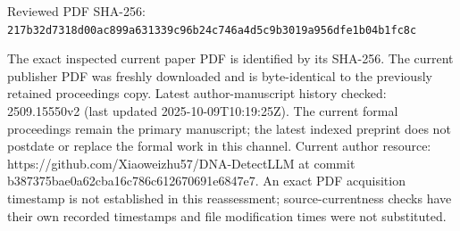 \documentclass[11pt]{article}
\begin{document}
Reviewed PDF SHA-256: \nolinkurl{217b32d7318d00ac899a631339c96b24c746a4d5c9b3019a956dfe1b04b1fc8c}

The exact inspected current paper PDF is identified by its SHA-256. The current publisher PDF was freshly downloaded and is byte-identical to the previously retained proceedings copy. Latest author-manuscript history checked: 2509.15550v2 (last updated 2025-10-09T10:19:25Z). The current formal proceedings remain the primary manuscript; the latest indexed preprint does not postdate or replace the formal work in this channel. Current author resource: https://github.com/Xiaoweizhu57/DNA-DetectLLM at commit b387375bae0a62cba16c786c612670691e6847e7.  An exact PDF acquisition timestamp is not established in this reassessment; source-currentness checks have their own recorded timestamps and file modification times were not substituted.
\end{document}
